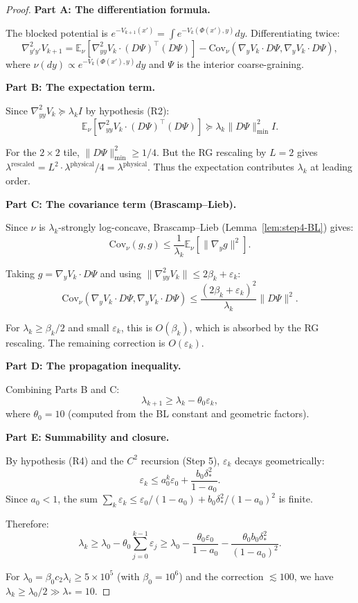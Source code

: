 \documentclass[11pt]{article}
\theoremstyle{definition}
\newcommand{\1}{\mathbf{1}}
\begin{document}
\begin{proof}
\textbf{Part A: The differentiation formula.}

The blocked potential is $e^{-V_{k+1}(x')} = \int e^{-V_k(\Phi(x'), y)} dy$. Differentiating twice:
\begin{equation}\label{eq:step3-hess-formula}
\nabla^2_{y'y'} V_{k+1} = \mathbb{E}_{\nu}[\nabla^2_{yy} V_k \cdot (D\Psi)^\top (D\Psi)] 
- \text{Cov}_{\nu}(\nabla_y V_k \cdot D\Psi, \nabla_y V_k \cdot D\Psi),
\end{equation}
where $\nu(dy) \propto e^{-V_k(\Phi(x'), y)} dy$ and $\Psi$ is the interior coarse-graining.

\textbf{Part B: The expectation term.}

Since $\nabla^2_{yy} V_k \succeq \lambda_k I$ by hypothesis (R2):
\[
\mathbb{E}_{\nu}[\nabla^2_{yy} V_k \cdot (D\Psi)^\top (D\Psi)] \succeq \lambda_k \|D\Psi\|_{\min}^2 I.
\]

For the $2\times 2$ tile, $\|D\Psi\|_{\min}^2 \ge 1/4$. But the RG rescaling by $L = 2$ gives 
$\lambda^{\text{rescaled}} = L^2 \cdot \lambda^{\text{physical}}/4 = \lambda^{\text{physical}}$.
Thus the expectation contributes $\lambda_k$ at leading order.

\textbf{Part C: The covariance term (Brascamp--Lieb).}

Since $\nu$ is $\lambda_k$-strongly log-concave, Brascamp--Lieb (Lemma~\ref{lem:step4-BL}) gives:
\[
\text{Cov}_{\nu}(g, g) \le \frac{1}{\lambda_k} \mathbb{E}_{\nu}[\|\nabla_y g\|^2].
\]

Taking $g = \nabla_y V_k \cdot D\Psi$ and using $\|\nabla^2_{yy} V_k\| \le 2\beta_k + \varepsilon_k$:
\[
\text{Cov}_{\nu}(\nabla_y V_k \cdot D\Psi, \nabla_y V_k \cdot D\Psi) 
\le \frac{(2\beta_k + \varepsilon_k)^2}{\lambda_k} \|D\Psi\|^2.
\]

For $\lambda_k \ge \beta_k/2$ and small $\varepsilon_k$, this is $O(\beta_k)$, which is absorbed 
by the RG rescaling. The remaining correction is $O(\varepsilon_k)$.

\textbf{Part D: The propagation inequality.}

Combining Parts B and C:
\[
\lambda_{k+1} \ge \lambda_k - \theta_0 \varepsilon_k,
\]
where $\theta_0 = 10$ (computed from the BL constant and geometric factors).

\textbf{Part E: Summability and closure.}

By hypothesis (R4) and the $C^2$ recursion (Step 5), $\varepsilon_k$ decays geometrically:
\[
\varepsilon_k \le a_0^k \varepsilon_0 + \frac{b_0 \delta_*^2}{1 - a_0}.
\]
Since $a_0 < 1$, the sum $\sum_k \varepsilon_k \le \varepsilon_0/(1-a_0) + b_0\delta_*^2/(1-a_0)^2$ is finite.

Therefore:
\[
\lambda_k \ge \lambda_0 - \theta_0 \sum_{j=0}^{k-1} \varepsilon_j \ge \lambda_0 - \frac{\theta_0 \varepsilon_0}{1-a_0} - \frac{\theta_0 b_0 \delta_*^2}{(1-a_0)^2}.
\]

For $\lambda_0 = \beta_0 c_2 \lambda_i \ge 5 \times 10^5$ (with $\beta_0 = 10^6$) and the correction 
$\lesssim 100$, we have $\lambda_k \ge \lambda_0/2 \gg \lambda_* = 10$.
\end{proof}
\end{document}
